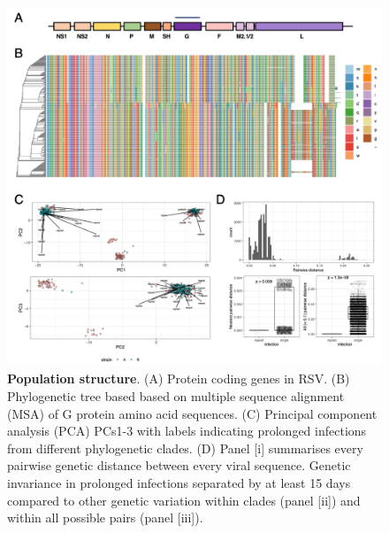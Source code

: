 \documentclass{article} %
\begin{document}
\begin{figure}[ht] \hspace{-0.5cm} 
    \includegraphics[scale=0.8]{f2}
	\caption{\textbf{Population structure}.
(A) Protein coding genes in RSV.
(B) Phylogenetic tree based based on multiple sequence alignment (MSA) of G protein amino acid sequences.
(C) Principal component analysis (PCA) PCs1-3 with labels indicating prolonged infections from different phylogenetic clades.
(D) Panel [i] summarises every pairwise genetic distance between every viral sequence.
Genetic invariance in prolonged infections separated by at least 15 days compared to other genetic variation within clades  
(panel [ii]) and within all possible pairs (panel [iii]).}
	\label{fig:2} 
\end{figure}
\clearpage
\end{document}
